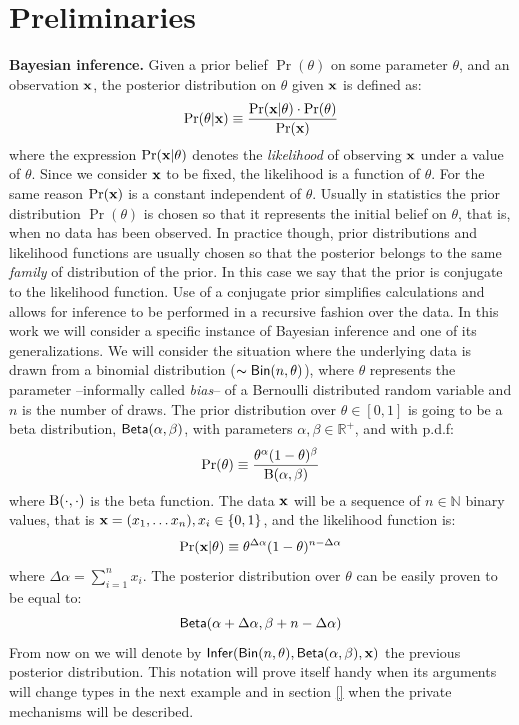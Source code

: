 \documentclass{article}
\begin{document}
\section{Preliminaries}
\label{sec_background}
\noindent \textbf{Bayesian inference.} 
Given a prior belief $\Pr(\theta)$ on some parameter $\theta$,
and an observation $\textbf{x}$, the posterior distribution on $\theta$ given $\textbf{x}$ is defined as:
\[
  \Pr(\theta | \textbf{x}) \equiv \frac{\Pr(\textbf{x} | \theta) \cdot \Pr(\theta)}{\Pr(\textbf{x})}
\]
where the expression $\Pr(\textbf{x} | \theta)$ denotes the
\emph{likelihood} of observing $\textbf{x}$ under a value of
$\theta$. Since we consider $\textbf{x}$ to be fixed, the likelihood is
a function of $\theta$.
For the same reason $\Pr(\textbf{x})$ is a constant independent of $\theta$.
Usually in statistics the prior distribution $\Pr(\theta)$ is chosen so that it represents
the initial belief on $\theta$, that is, when no data has been observed. In practice though,
prior distributions and likelihood functions are usually chosen so that the posterior
belongs to the same \emph{family} of distribution of the prior. In this case we say that the prior
is conjugate to the likelihood function. Use of a conjugate prior
simplifies calculations and allows for inference to be performed in a
recursive fashion over the data.
In this work we will consider a specific instance of Bayesian inference and one of its generalizations.
We will consider the situation where the underlying data is drawn from a binomial distribution
($\thicksim \mathsf{Bin}(n, \theta)$), where $\theta$ represents
the parameter --informally called \emph{bias}-- of a Bernoulli
distributed random variable and $n$ is the number of draws. The
prior distribution over $\theta\in [0,1]$ is going to be a beta
distribution, $\mathsf{Beta}(\alpha, \beta)$, with parameters
$\alpha,\beta\in\mathbb{R}^{+}$, and with p.d.f:
\[
  \Pr(\theta)\equiv \frac{\theta^{\alpha} (1- \theta)^{\beta}}{\textup{B}(\alpha,\beta)}
\]
where $\textup{B}(\cdot,\cdot)$ is the beta function.
The data $\textbf{x}$ will be a sequence of $n\in\mathbb{N}$ binary values, that is $\textbf{x}= (x_1,\dots x_n), x_i\in\{0,1\}$, and the likelihood function is:
\[
  \Pr(\textbf{x} | \theta)\equiv \theta^{\Delta \alpha}(1-\theta)^{n - \Delta \alpha}
\]
where $\Delta \alpha = \displaystyle\sum_{i=1}^{n}x_i$.
The posterior distribution over $\theta$ can be easily proven to be equal to:\[\mathsf{Beta}(\alpha + \Delta \alpha,\beta + n - \Delta \alpha)\]
From now on we will denote by $\mathsf{Infer}(\mathsf{Bin}(n, \theta), \mathsf{Beta}(\alpha, \beta), \textbf{x})$ the previous
posterior distribution. This notation will prove itself handy when its arguments will change types in the next example and
in section \ref{} when the private mechanisms will be described.
\end{document}
